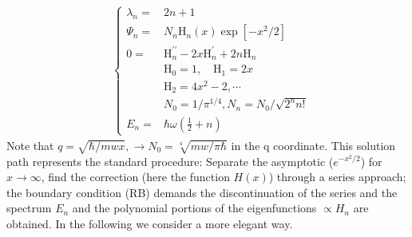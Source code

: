 \begin{equation}
\begin{aligned}
&\left\{\begin{array}{cl}{\lambda_{n}=} & {2n+1} \\ {\Psi_{n}=} & {N_{n} \mathrm{H}_{n}(x) \exp \left[-x^{2} / 2\right]} \\ {0=} & {\mathrm{H}_{n}^{\prime \prime}-2 x \mathrm{H}_{n}^{\prime}+2 n \mathrm{H}_{n}}\\ & \mathrm{H}_{0}=1, \quad \mathrm{H}_{1}=2 x \\ & \mathrm{H}_{2}=4 x^{2}-2, \cdots \\ & N_{0}=1 / \pi^{1 / 4}, N_{n}=N_{0} / \sqrt{2^{n} n !} \\ E_{n}=& \hbar \omega\left(\frac{1}{2}+n\right) 
\end{array}\right.
\end{aligned}
\end{equation}
Note that $q = \sqrt{\hbar/mwx} , \to N_0=\sqrt[4]{mw/\pi\hbar}$ in the q coordinate. This solution path represents the standard procedure: Separate the asymptotic ($e^{-x^2/2}$) for$ x \to\infty$, find the correction (here the function $H (x)$) through a series approach; the boundary condition (RB) demands the discontinuation of the series and the spectrum $E_n$ and the polynomial portions of the eigenfunctions $\propto H_n$ are obtained. In the following we consider a more elegant way.
